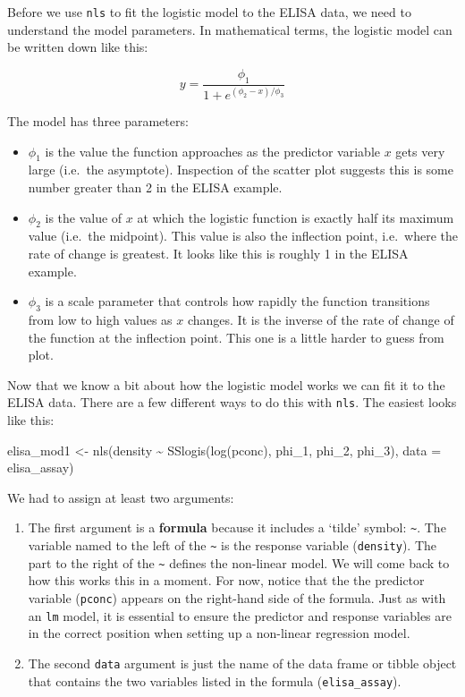 \documentclass[
]{book}
\newenvironment{Shaded}{\begin{snugshade}}{\end{snugshade}}
\newcommand{\AttributeTok}[1]{\textcolor[rgb]{0.77,0.63,0.00}{#1}}
\newcommand{\FunctionTok}[1]{\textcolor[rgb]{0.00,0.00,0.00}{#1}}
\newcommand{\NormalTok}[1]{#1}
\newcommand{\OtherTok}[1]{\textcolor[rgb]{0.56,0.35,0.01}{#1}}
\newcommand{\SpecialCharTok}[1]{\textcolor[rgb]{0.00,0.00,0.00}{#1}}
\providecommand{\tightlist}{%
  \setlength{\itemsep}{0pt}\setlength{\parskip}{0pt}}
\begin{document}
Before we use \texttt{nls} to fit the logistic model to the ELISA data, we need to understand the model parameters. In mathematical terms, the logistic model can be written down like this:

\[y = \frac{\phi_1}{1 + e^{ (\phi_2 - x) / \phi_3 }}\]

The model has three parameters:

\begin{itemize}
\tightlist
\item
  \(\phi_1\) is the value the function approaches as the predictor variable \(x\) gets very large (i.e.~the asymptote). Inspection of the scatter plot suggests this is some number greater than 2 in the ELISA example.
\item
  \(\phi_2\) is the value of \(x\) at which the logistic function is exactly half its maximum value (i.e.~the midpoint). This value is also the inflection point, i.e.~where the rate of change is greatest. It looks like this is roughly 1 in the ELISA example.
\item
  \(\phi_3\) is a scale parameter that controls how rapidly the function transitions from low to high values as \(x\) changes. It is the inverse of the rate of change of the function at the inflection point. This one is a little harder to guess from plot.
\end{itemize}

Now that we know a bit about how the logistic model works we can fit it to the ELISA data. There are a few different ways to do this with \texttt{nls}. The easiest looks like this:

\begin{Shaded}
\begin{Highlighting}[]
\NormalTok{elisa\_mod1 }\OtherTok{\textless{}{-}}
  \FunctionTok{nls}\NormalTok{(density }\SpecialCharTok{\textasciitilde{}} \FunctionTok{SSlogis}\NormalTok{(}\FunctionTok{log}\NormalTok{(pconc), phi\_1, phi\_2, phi\_3), }
      \AttributeTok{data =}\NormalTok{ elisa\_assay)}
\end{Highlighting}
\end{Shaded}

We had to assign at least two arguments:

\begin{enumerate}
\def\labelenumi{\arabic{enumi}.}
\item
  The first argument is a \textbf{formula} because it includes a `tilde' symbol: \texttt{\textasciitilde{}}. The variable named to the left of the \texttt{\textasciitilde{}} is the response variable (\texttt{density}). The part to the right of the \texttt{\textasciitilde{}} defines the non-linear model. We will come back to how this works this in a moment. For now, notice that the the predictor variable (\texttt{pconc}) appears on the right-hand side of the formula. Just as with an \texttt{lm} model, it is essential to ensure the predictor and response variables are in the correct position when setting up a non-linear regression model.
\item
  The second \texttt{data} argument is just the name of the data frame or tibble object that contains the two variables listed in the formula (\texttt{elisa\_assay}).
\end{enumerate}
\end{document}
